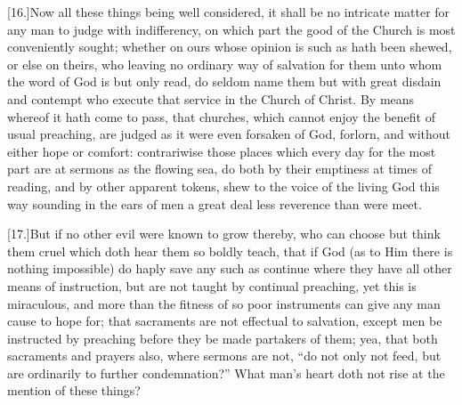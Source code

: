 [16.]Now all these things being well considered, it shall be no intricate matter for any man to judge with indifferency, on which part the good of the Church is most conveniently sought; whether on ours whose opinion is such as hath been shewed, or else on theirs, who leaving no ordinary way of  salvation for them unto whom the word of God is but only read,
 do seldom name them but with great disdain and contempt who execute that service in the Church of Christ. By means whereof it hath come to pass, that churches, which cannot enjoy the benefit of usual preaching, are judged as it were even forsaken of God, forlorn, and without either hope or comfort: contrariwise those places which every day for the most part are at sermons as the flowing sea, do both by their emptiness at times of reading, and by other apparent tokens, shew to the voice of the living God this way sounding in the ears of men a great deal less reverence than were meet.

[17.]But if no other evil were known to grow thereby, who can choose but think them cruel which doth hear them so boldly teach, that if God (as to Him there is nothing impossible) do haply save any such as continue where they have all other means of instruction, but are not taught by continual preaching, yet this is miraculous, and more than the fitness of so poor instruments can give any man cause to hope for; that sacraments are not effectual to salvation, except men be instructed by preaching before they be made partakers of them; yea, that both sacraments and prayers also, where sermons are not, “do not only not feed, but are ordinarily to  further condemnation?” What man’s heart doth not rise at the mention of these things?

